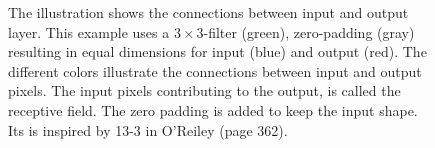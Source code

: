 \begin{figure}
    
    \caption{The illustration shows the connections between 
    input and output layer. This example uses a $3\times 3$-filter (green), zero-padding (gray) resulting in equal dimensions for input (blue) and output (red). The different colors illustrate the connections between input and output pixels. The input pixels contributing to the output, is called the receptive field. The zero padding is added to keep the input shape. Its is inspired by 13-3 in O'Reiley (page 362).  }
    \label{fig:convolution_padding}
\end{figure}